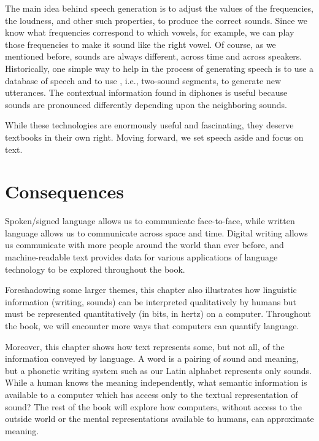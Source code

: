   

The main idea behind speech generation is to adjust the values of the
frequencies, the loudness, and other such properties, to produce the correct
sounds.  Since we know what frequencies correspond to which vowels,
for example, we can play those frequencies to make it sound like the
right vowel.  Of course, as we mentioned before, sounds are always
different, across time and across speakers.  Historically, one simple way to help in the
process of generating speech is to use a database of speech and to
use , i.e., two-sound segments, to generate new
utterances.  The contextual information found in diphones is useful because sounds are pronounced differently depending upon the neighboring sounds.

While these technologies are enormously useful and fascinating, they deserve textbooks in their own right. Moving forward, we set speech aside and focus on text.

\section{Consequences}

Spoken/signed language allows us to communicate face-to-face, while written language allows us to communicate across space and time.  Digital writing allows us communicate with more people around the world than ever before, and machine-readable text provides data for various applications of language technology to be explored throughout the book.


Foreshadowing some larger themes, this chapter also illustrates how linguistic information (writing, sounds) can be interpreted qualitatively by humans but must be represented quantitatively (in bits, in hertz) on a computer.  Throughout the book, we will encounter more ways that computers can quantify language.  

Moreover, this chapter shows how text represents some, but not all, of the information conveyed by language.  A word is a pairing of sound and meaning, but a phonetic writing system such as our Latin alphabet represents only  sounds.  While a human knows the meaning independently, what semantic information is available to a computer which has access only to the textual representation of  sound?  The rest of the book will explore how computers, without access to the outside world or the mental representations available to humans, can approximate meaning.



